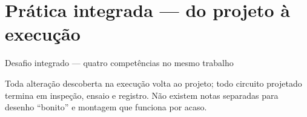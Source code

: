 
\section{Prática integrada — do projeto à execução}

\newcommand{\UnidadeDidaticaBase}{%
\draw[very thick](0,0)rectangle(8,6);
\draw[thick](0,2.4)--(8,2.4);
\draw[thick](5.0,2.4)--(5.0,6);
\draw[thick](2.8,0)--(2.8,2.4);
\draw[white,line width=5pt](1.0,0)--(2.0,0);\draw(1.0,0)--(2.0,1.0);
\draw[white,line width=5pt](1.0,2.4)--(1.9,2.4);\draw(1.0,2.4)--(1.9,3.3);
\draw[white,line width=5pt](5.5,2.4)--(6.4,2.4);\draw(5.5,2.4)--(6.4,3.3);
\draw[white,line width=5pt](2.8,.7)--(2.8,1.55);\draw(2.8,.7)--(3.65,1.55);
\node[font=\tiny\bfseries]at(2.5,5.5){SALA / QUARTO};
\node[font=\tiny\bfseries]at(6.5,5.5){COPA};
\node[font=\tiny\bfseries]at(1.4,1.95){BANHEIRO};
\node[font=\tiny\bfseries]at(5.4,1.2){ENTRADA / CIRCULAÇÃO};}

\begin{frame}{Desafio integrado — quatro competências no mesmo trabalho}
\centering
{}
\vspace{4mm}
\begin{caixaProjeto}[title=Regra da prática]
Toda alteração descoberta na execução volta ao projeto; todo circuito projetado termina em inspeção, ensaio e registro. Não existem notas separadas para desenho “bonito” e montagem que funciona por acaso.
\end{caixaProjeto}
\end{frame}

